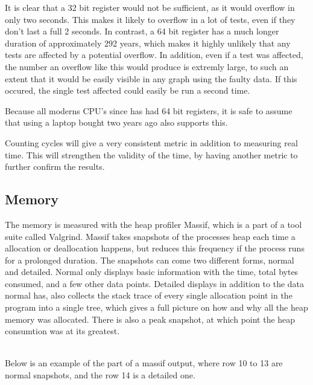 \bigskip

\noindent It is clear that a 32 bit register would not be sufficient, as it would overflow in only two seconds.
This makes it likely to overflow in a lot of tests, even if they don't last a full 2 seconds.
In contrast, a 64 bit register has a much longer duration of approximately 292 years, which makes it highly unlikely that any tests are affected by a potential overflow.
In addition, even if a test was affected, the number an overflow like this would produce is extremly large, to such an extent that it would be easily visible in any graph using the faulty data.
If this occured, the single test affected could easily be run a second time.

\smallskip

Because all moderns CPU's since  has had 64 bit registers, it is safe to assume that using a laptop bought two years ago also supports this.

\smallskip

Counting cycles will give a very consistent metric in addition to measuring real time.
This will strengthen the validity of the time, by having another metric to further confirm the results.

\subsection{Memory}
The memory is measured with the heap profiler Massif, which is a part of a tool suite called Valgrind.
Massif takes snapshots of the processes heap each time a allocation or deallocation happens, but reduces this frequency if the process runs for a prolonged duration.
The snapshots can come two different forms, normal and detailed.
Normal only displays basic information with the time, total bytes consumed, and a few other data points.
Detailed displays in addition to the data normal has, also collects the stack trace of every single allocation point in the program into a single tree, which gives a full picture on how and why all the heap memory was allocated.
There is also a peak snapshot, at which point the heap consumtion was at its greatest.

\\
\noindent Below is an example of the part of a massif output, where row 10 to 13 are normal snapshots, and the row 14 is a detailed one. 

